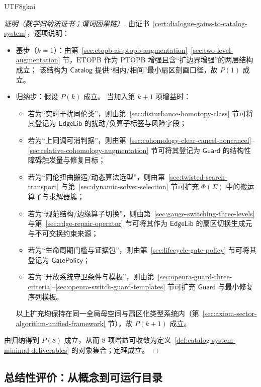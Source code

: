\documentclass[12pt]{article}
\newcommand{\PTOPB}{\ensuremath{\mathrm{PTOPB}}}
\newcommand{\ETOPB}{\ensuremath{\mathrm{ETOPB}}}
\begin{document}
\begin{CJK*}{UTF8}{gkai}
\begin{proof}[证明（数学归纳法证书；谓词因果链）]
由证书~\ref{cert:dialogue-gains-to-catalog-system}，逐项说明：
\begin{itemize}
  \item 基步（$k=1$）：由第~\ref{sec:etopb-as-ptopb-augmentation}--\ref{sec:two-level-augmentation} 节，\ETOPB{} 作为 \PTOPB{}
    增强且含“扩边界增强”的两层结构成立；
  该结构为 $\mathsf{Catalog}$ 提供“相内/相间”最小扇区刻画口径，故 $P(1)$ 成立。
  \item 归纳步：假设 $P(k)$ 成立。
  当加入第 $k+1$ 项增益时：
  \begin{itemize}
    \item 若为“实时干扰同伦类”，则由第~\ref{sec:disturbance-homotopy-class} 节可将其登记为 $\mathsf{EdgeLib}$ 的扰动/负算子标签与风险字段；
    \item 若为“上同调可消判据”，则由第~\ref{sec:cohomology-clear-cancel-noncancel}--\ref{sec:relative-cohomology-augmentation}
      节可将其登记为 $\mathsf{Guard}$ 的结构性障碍触发量与修复目标；
    \item 若为“同伦扭曲搬运/动态算法选型”，则由第~\ref{sec:twisted-search-transport} 与第~\ref{sec:dynamic-solver-selection} 节可扩充
      $\Phi(\Sigma)$ 中的搬运算子与求解器簇；
    \item 若为“规范结构/边缘算子切换”，则由第~\ref{sec:gauge-switching-three-levels} 与第~\ref{sec:edge-repair-operator} 节可将其作为
      $\mathsf{EdgeLib}$ 的扇区切换生成元与不可交换约束来源；
    \item 若为“生命周期门槛与证据包”，则由第~\ref{sec:lifecycle-gate-policy} 节可将其登记为 $\mathsf{GatePolicy}$；
    \item 若为“开放系统守卫条件与模板”，则由第~\ref{sec:openra-guard-three-criteria}--\ref{sec:openra-switch-guard-templates} 节可扩充
      $\mathsf{Guard}$ 与最小修复序列模板。
  \end{itemize}
  以上扩充均保持在同一全局母空间与扇区化类型系统内（第~\ref{sec:axiom-sector-algorithm-unified-framework} 节），故 $P(k+1)$ 成立。
\end{itemize}
由归纳得到 $P(8)$ 成立，从而 8 项增益可收敛为定义~\ref{def:catalog-system-minimal-deliverables} 的对象集合；定理成立。
\end{proof}

\subsection{总结性评价：从概念到可运行目录}
\label{sec:dialogue-evaluation}


\end{CJK*}
\end{document}
